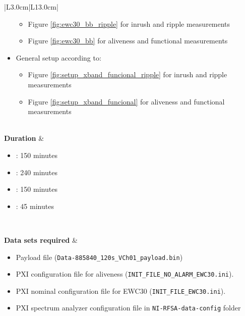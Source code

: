 \begin{table}[H]
\begin{tabular}{|L{3.0cm}|L{13.0cm}|}
\begin{minipage}[t]{\linewidth}
\begin{itemize}[nosep,after=\strut]
			\begin{itemize}
			\item Figure \ref{fig:ewc30_bb_ripple} for inrush and ripple measurements 
			\item Figure \ref{fig:ewc30_bb} for aliveness and functional measurements
			\end{itemize}
		\item General setup according to:
			\begin{itemize}
			\item Figure \ref{fig:setup_xband_funcional_ripple} for inrush and ripple measurements 
			\item Figure \ref{fig:setup_xband_funcional} for aliveness and functional measurements
			\end{itemize}
		\end{itemize}
	\end{minipage}	\\ \hline
		\textbf{Duration} & 
		\begin{minipage}[t]{\linewidth}
	\begin{itemize}[nosep,after=\strut]
		\item {}: 150 minutes
		\item {}: 240 minutes

		\item {}: 150 minutes		
		\item {}: 45 minutes 
		\end{itemize}
	\end{minipage}
	\\ \hline
	
	\textbf{Data sets required} &  \begin{minipage}[t]{\linewidth}
		\begin{itemize}[nosep,after=\strut]
			\item Payload file (\texttt{Data-885840\_120s\_VCh01\_payload.bin})
			\item \comEgse\xspace PXI configuration file for aliveness (\texttt{INIT\_FILE\_NO\_ALARM\_EWC30.ini}).
			\item \comEgse\xspace PXI nominal configuration file for EWC30 (\texttt{INIT\_FILE\_EWC30.ini}).
			\item PXI spectrum analyzer configuration file in \texttt{NI-RFSA-data-config} folder
				\end{itemize}
			\end{minipage}\\
		\hline
		

\end{tabular}
\end{table}
